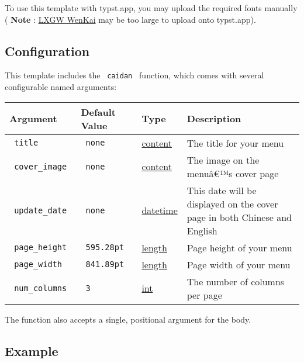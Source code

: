 To use this template with typst.app, you may upload the required fonts
manually ( \textbf{Note} :
\href{https://github.com/lxgw/LxgwWenKai}{LXGW WenKai} may be too large
to upload onto typst.app).

\subsection{Configuration}\label{configuration}

This template includes the \texttt{\ caidan\ } function, which comes
with several configurable named arguments:

\begin{longtable}[]{@{}llll@{}}
\toprule\noalign{}
Argument & Default Value & Type & Description \\
\midrule\noalign{}
\endhead
\bottomrule\noalign{}
\endlastfoot
\texttt{\ title\ } & \texttt{\ none\ } &
\href{https://typst.app/docs/reference/foundations/content/}{content} &
The title for your menu \\
\texttt{\ cover\_image\ } & \texttt{\ none\ } &
\href{https://typst.app/docs/reference/foundations/content/}{content} &
The image on the menuâ€™s cover page \\
\texttt{\ update\_date\ } & \texttt{\ none\ } &
\href{https://typst.app/docs/reference/foundations/datetime/}{datetime}
& This date will be displayed on the cover page in both Chinese and
English \\
\texttt{\ page\_height\ } & \texttt{\ 595.28pt\ } &
\href{https://typst.app/docs/reference/layout/length/}{length} & Page
height of your menu \\
\texttt{\ page\_width\ } & \texttt{\ 841.89pt\ } &
\href{https://typst.app/docs/reference/layout/length/}{length} & Page
width of your menu \\
\texttt{\ num\_columns\ } & \texttt{\ 3\ } &
\href{https://typst.app/docs/reference/foundations/int/}{int} & The
number of columns per page \\
\end{longtable}

The function also accepts a single, positional argument for the body.

\subsection{Example}\label{example}

